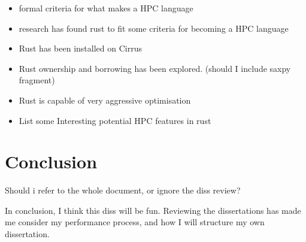 \documentclass{report}[a4]
\begin{document}
\begin{itemize}
  \item formal criteria for what makes a HPC language
  \item research has found rust to fit some criteria for becoming a HPC language
  \item Rust has been installed on Cirrus
  \item Rust ownership and borrowing has been explored. (should I include saxpy fragment)
  \item Rust is capable of very aggressive optimisation
  \item List some Interesting potential HPC features in rust
\end{itemize}


\chapter{Conclusion}
Should i refer to the whole document, or ignore the diss review?

In conclusion, I think this diss will be fun. Reviewing the dissertations has made me consider my performance process, and how I will structure my own dissertation.
\pagebreak


\end{document}
